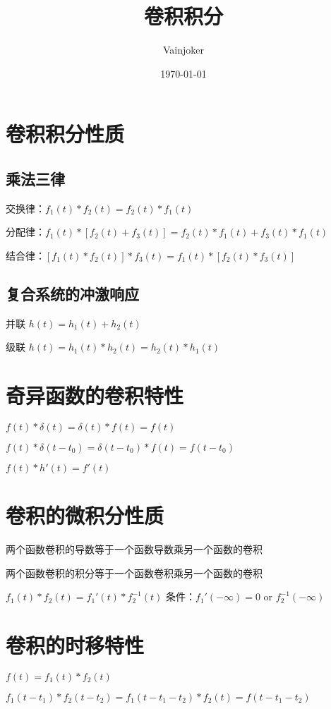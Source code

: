 \documentclass{article}
\title{卷积积分}
\author{Vainjoker}
\date{\today}
\begin{document}
    \maketitle
    \newpage
    \section{卷积积分性质}
    \subsection{乘法三律}

    交换律：$f_1(t)*f_2(t)=f_2(t)*f_1(t)$

    分配律：$f_1(t)*[f_2(t)+f_3(t)]=f_2(t)*f_1(t)+f_3(t)*f_1(t)$

    结合律：$[f_1(t)*f_2(t)]*f_3(t)=f_1(t)*[f_2(t)*f_3(t)]$
    
    \subsection{复合系统的冲激响应}
    并联
    $h(t)=h_1(t)+h_2(t)$

    级联
    $h(t)=h_1(t)*h_2(t)=h_2(t)*h_1(t)$

    \section{奇异函数的卷积特性}

    $f(t)*\delta(t)=\delta(t)*f(t)=f(t)$

    $f(t)*\delta(t-t_0)=\delta(t-t_0)*f(t)=f(t-t_0)$

    $f(t)*h'(t)=f'(t)$

    \section{卷积的微积分性质}

    两个函数卷积的导数等于一个函数导数乘另一个函数的卷积

    两个函数卷积的积分等于一个函数卷积乘另一个函数的卷积

    $f_1(t)*f_2(t)=f_1'(t)*f_{2}^{-1}(t)$
    条件：$f_1'(-\infty)=0$ or $f_{2}^{-1}(-\infty)$

    \section{卷积的时移特性}
    $f(t)=f_1(t)*f_2(t)$

    $f_1(t-t_1)*f_2(t-t_2)=f_1(t-t_1-t_2)*f_2(t)=f(t-t_1-t_2)$
    
\end{document}
